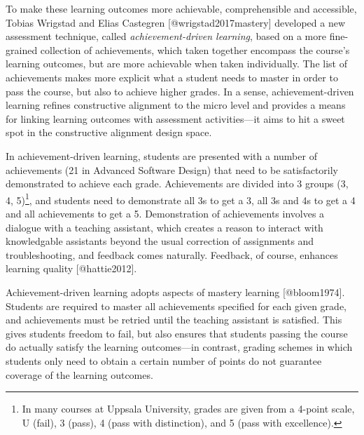 \documentclass[
]{article}
\begin{document}
To make these learning outcomes more achievable, comprehensible and
accessible, Tobias Wrigstad and Elias Castegren
{[}@wrigstad2017mastery{]} developed a new assessment technique, called
\textit{achievement-driven learning}, based on a more fine-grained
collection of achievements, which taken together encompass the course's
learning outcomes, but are more achievable when taken individually. The
list of achievements makes more explicit what a student needs to master
in order to pass the course, but also to achieve higher grades. In a
sense, achievement-driven learning refines constructive alignment to the
micro level and provides a means for linking learning outcomes with
assessment activities---it aims to hit a sweet spot in the constructive
alignment design space.

In achievement-driven learning, students are presented with a number of
achievements (21 in Advanced Software Design) that need to be
satisfactorily demonstrated to achieve each grade. Achievements are
divided into 3 groups (3, 4,
5)\footnote{In many courses at Uppsala University, grades are given from a 4-point scale, U (fail),
3 (pass), 4 (pass with distinction), and 5 (pass with excellence).}, and
students need to demonstrate all 3s to get a 3, all 3s and 4s to get a 4
and all achievements to get a 5. Demonstration of achievements involves
a dialogue with a teaching assistant, which creates a reason to interact
with knowledgable assistants beyond the usual correction of assignments
and troubleshooting, and feedback comes naturally. Feedback, of course,
enhances learning quality {[}@hattie2012{]}.

Achievement-driven learning adopts aspects of mastery learning
{[}@bloom1974{]}. Students are required to master all achievements
specified for each given grade, and achievements must be retried until
the teaching assistant is satisfied. This gives students freedom to
fail, but also ensures that students passing the course do actually
satisfy the learning outcomes---in contrast, grading schemes in which
students only need to obtain a certain number of points do not guarantee
coverage of the learning outcomes.
\end{document}
